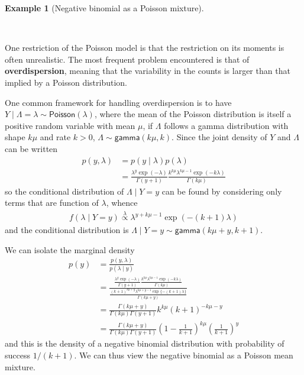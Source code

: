 \documentclass[
  11pt,
  letterpaper,
]{scrbook}
\theoremstyle{definition}
\theoremstyle{definition}
\newtheorem{example}{Example}[chapter]
\theoremstyle{definition}
\theoremstyle{plain}
\theoremstyle{plain}
\theoremstyle{remark}
\begin{document}
\begin{example}[Negative binomial as a Poisson
mixture]\protect\hypertarget{exm-poisson-negbin}{}\label{exm-poisson-negbin}

~

One restriction of the Poisson model is that the restriction on its
moments is often unrealistic. The most frequent problem encountered is
that of \textbf{overdispersion}, meaning that the variability in the
counts is larger than that implied by a Poisson distribution.

One common framework for handling overdispersion is to have
\(Y \mid \Lambda = \lambda \sim \mathsf{Poisson}(\lambda)\), where the
mean of the Poisson distribution is itself a positive random variable
with mean \(\mu\), if \(\Lambda\) follows a gamma distribution with
shape \(k\mu\) and rate \(k>0\),
\(\Lambda \sim \mathsf{gamma}(k\mu, k)\). Since the joint density of
\(Y\) and \(\Lambda\) can be written \begin{align*}
p(y, \lambda) &= p(y \mid \lambda)p(\lambda) \\
&= \frac{\lambda^y\exp(-\lambda)}{\Gamma(y+1)}  \frac{k^{k\mu}\lambda^{k\mu-1}\exp(-k\lambda)}{\Gamma(k\mu)}
\end{align*} so the conditional distribution of \(\Lambda \mid Y=y\) can
be found by considering only terms that are function of \(\lambda\),
whence \begin{align*}
f(\lambda \mid Y=y) \stackrel{\lambda}{\propto}\lambda^{y+k\mu-1}\exp(-(k+1)\lambda)
\end{align*} and the conditional distribution is
\(\Lambda \mid Y=y \sim \mathsf{gamma}(k\mu + y, k+1)\).

We can isolate the marginal density \begin{align*}
p(y) &= \frac{p(y, \lambda)}{p(\lambda \mid y)} \\&= \frac{\frac{\lambda^y\exp(-\lambda)}{\Gamma(y+1)}  \frac{k^{k\mu}\lambda^{k\mu-1}\exp(-k\lambda)}{\Gamma(k\mu)}}{ \frac{(k+1)^{k\mu+y}\lambda^{k\mu+y-1}\exp\{-(k+1)\lambda\}}{\Gamma(k\mu+y)}}\\
&= \frac{\Gamma(k\mu+y)}{\Gamma(k\mu)\Gamma(y+1)}k^{k\mu} (k+1)^{-k\mu-y}\\&= \frac{\Gamma(k\mu+y)}{\Gamma(k\mu)\Gamma(y+1)}\left(1-\frac{1}{k+1}\right)^{k\mu} \left(\frac{1}{k+1}\right)^y
\end{align*} and this is the density of a negative binomial distribution
with probability of success \(1/(k+1)\). We can thus view the negative
binomial as a Poisson mean mixture.


\end{example}
\end{document}
